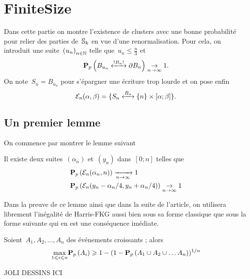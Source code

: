 \section{FiniteSize}
Dans cette partie on montre l'existence de clusters avec une bonne probabilité pour relier des parties de~$\mathbb{S}_k$ en vue d'une renormalisation. Pour cela, on introduit une suite~$\suite{u}$ telle que~$u_n \leqslant \frac{n}{3}$ et
	\[
		\Pp{\relie*[B_n]{B_{u_n}}{\partial B_n}} \underset{n \to \infty}{\to} 1.
	\] 
	On note~$S_n = B_{u_n}$ pour s'épargner une écriture trop lourde et on pose enfin
	\[
		\mathcal{E}_n( \alpha, \beta ) = \{\relie[B_n]{S_n}{\{n\} \times [ \alpha ; \beta ]} \}.
	\]
	\subsection{Un premier lemme}
		On commence par montrer le lemme suivant
		\begin{lem}\label{lem:collagesElem} 
			Il existe deux suites~$(\alpha_n)$ et~$(y_n)$ dans~$[0; n]$ telles que %
			\begin{align*}
				  &\Pp{\mathcal{E}_n(\alpha_n, n)} \xrightarrow[n\to\infty]{} 1 \\ 
				  &\Pp{\mathcal{E}_n(y_n - \alpha_n/4, y_n + \alpha_n/4)} \underset{n \to \infty}{\to} 1 %
			\end{align*}
		\end{lem}
		Dans la preuve de ce lemme ainsi que dans la suite de l'article, on utilisera librement l'inégalité de Harris-FKG aussi bien sous sa forme classique que sous la forme suivante qui en est une conséquence imédiate. %
		\begin{lem}\label{lem:HarrisFKG} %
			Soient~$A_1, A_2, \ldots, A_n$ des événements croissants ; alors %
			\[
				\underset{1 \leq i \leq n}{\max} \Pp{A_i} \geq 1 - (1 - \Pp{A_1 \cup A_2 \cup \ldots A_n})^{1/n} %
			\]
		\end{lem}
		
		JOLI DESSINS ICI %

